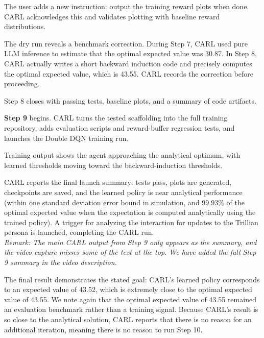 \documentclass[mnsc,sglanonrev]{informs4}
\begin{document}
\begin{description}[leftmargin=1.0in,style=nextline]
\item[\href{https://youtu.be/Qx673uczp4c?t=825}{\texttt{13:45}}]
The user adds a new instruction: output the training reward plots when done. CARL acknowledges this and validates plotting with baseline reward distributions.

\item[\href{https://youtu.be/Qx673uczp4c?t=880}{\texttt{14:40}}]
The dry run reveals a benchmark correction. During Step 7, CARL used pure LLM inference to estimate that the optimal expected value was 30.87. In Step 8, CARL actually writes a short backward induction code and precisely computes the optimal expected value, which is 43.55. CARL records the correction before proceeding.

\item[\href{https://youtu.be/Qx673uczp4c?t=1110}{\texttt{18:30}}]
Step 8 closes with passing tests, baseline plots, and a summary of code artifacts.

\item[\href{https://youtu.be/Qx673uczp4c?t=1115}{\texttt{18:35}}]
{\bf Step 9} begins. CARL turns the tested scaffolding into the full training repository, adds evaluation scripts and reward-buffer regression tests, and launches the Double DQN training run.

\item[\href{https://youtu.be/Qx673uczp4c?t=1300}{\texttt{21:40}}]
Training output shows the agent approaching the analytical optimum, with learned thresholds moving toward the backward-induction thresholds.

\item[\href{https://youtu.be/Qx673uczp4c?t=1525}{\texttt{25:25}}]
CARL reports the final launch summary: tests pass, plots are generated, checkpoints are saved, and the learned policy is near analytical performance (within one standard deviation error bound in simulation, and $99.93\%$ of the optimal expected value when the expectation is computed analytically using the trained policy). A trigger for analyzing the interaction for updates to the Trillian persona is launched, completing the CARL run.\\\textit{Remark: The main CARL output from Step 9 only appears as the summary, and the video capture misses some of the text at the top. We have added the full Step 9 summary in the video description.}

\end{description}

The final result demonstrates the stated goal: CARL's learned policy corresponds to an expected value of 43.52, which is extremely close to the optimal expected value of 43.55. We note again that the optimal expected value of 43.55 remained an evaluation benchmark rather than a training signal. Because CARL's result is so close to the analytical solution, CARL reports that there is no reason for an additional iteration, meaning there is no reason to run Step 10. 
\end{document}
